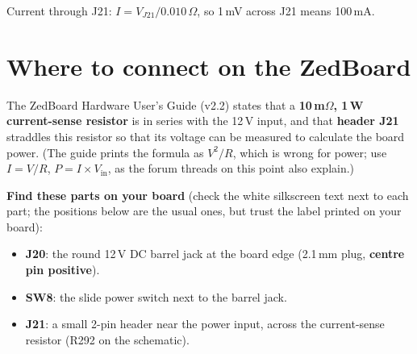 \documentclass[11pt,a4paper]{article}
\begin{document}
\medskip
Current through J21: $I = V_{J21}/0.010\,\Omega$, so 1\,mV across J21 means 100\,mA.

\section{Where to connect on the ZedBoard}\label{sec:where}

The ZedBoard Hardware User's Guide (v2.2) states that a \textbf{10\,m$\Omega$, 1\,W current-sense resistor} is in series with the 12\,V input, and that \textbf{header J21} straddles this resistor so that its voltage can be measured to calculate the board power. (The guide prints the formula as $V^2/R$, which is wrong for power; use $I = V/R$, $P = I\times V_\mathrm{in}$, as the forum threads on this point also explain.)

\textbf{Find these parts on your board} (check the white silkscreen text next to each part; the positions below are the usual ones, but trust the label printed on your board):
\begin{itemize}
  \item \textbf{J20}: the round 12\,V DC barrel jack at the board edge (2.1\,mm plug, \textbf{centre pin positive}).
  \item \textbf{SW8}: the slide power switch next to the barrel jack.
  \item \textbf{J21}: a small 2-pin header near the power input, across the current-sense resistor (R292 on the schematic).
\end{itemize}
\end{document}
